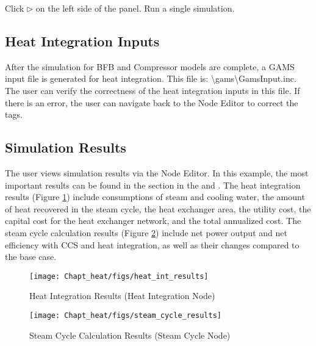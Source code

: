 Click $\triangleright$ on the left side of the panel. Run a single simulation.

\subsection{Heat Integration Inputs}

After the simulation for BFB and Compressor models are complete, a GAMS input file is generated for heat integration. This file is: \textbackslash gams\textbackslash GamsInput.inc. The user can verify the correctness of the heat integration inputs in this file. If there is an error, the user can navigate back to the Node Editor to correct the tags.

\subsection{Simulation Results}

The user views simulation results via the Node Editor. In this example, the most important results can be found in the  section in the  and . The heat integration results (Figure \ref{heat.int.results}) include consumptions of steam and cooling water, the amount of heat recovered in the steam cycle, the heat exchanger area, the utility cost, the capital cost for the heat exchanger network, and the total annualized cost. The steam cycle calculation results (Figure \ref{steam.cycle.results}) include net power output and net efficiency with CCS and heat integration, as well as their changes compared to the base case.

\begin{figure}[H]
	\begin{center}
		\texttt{[image: Chapt\_heat/figs/heat\_int\_results]}
		\caption{Heat Integration Results (Heat Integration Node)}
		\label{heat.int.results}
	\end{center}
\end{figure}

\begin{figure}[H]
	\begin{center}
		\texttt{[image: Chapt\_heat/figs/steam\_cycle\_results]}
		\caption{Steam Cycle Calculation Results (Steam Cycle Node)}
		\label{steam.cycle.results}
	\end{center}
\end{figure}

\clearpage
 
